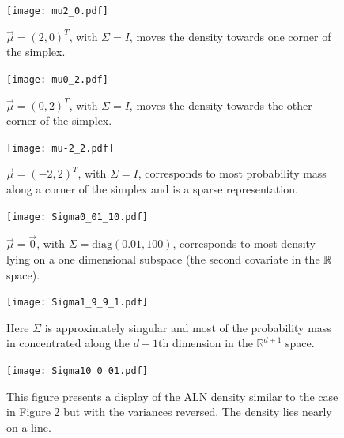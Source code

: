 \begin{figure}[ht]
\begin{minipage}[b]{0.45\linewidth}
\centering
\texttt{[image: mu2\_0.pdf]}
\caption[ALN plot with a mean vector $(2,0)^{T}$]{$\vec{\mu}=(2,0)^T$, with $\Sigma=I$, moves the density towards one corner of the simplex. }
\label{fig:figure1}
\end{minipage}
\hspace{0.5cm}
\begin{minipage}[b]{0.45\linewidth}
\centering
\texttt{[image: mu0\_2.pdf]}
\caption[ALN plot with mean vector $(2,0)^{T}$]{$\vec{\mu}=(0,2)^T$, with $\Sigma=I$, moves the density towards the other corner of the simplex. }
\label{fig:figur2}
\end{minipage}
\end{figure}

\begin{figure}[ht]
\begin{minipage}[b]{0.45\linewidth}
\centering
\texttt{[image: mu-2\_2.pdf]}
\caption[ALN plot with a mean vector of $(-2,2)^{T}$]{$\vec{\mu}=(-2,2)^T$, with $\Sigma=I$, corresponds to most probability mass along a corner of the simplex and is a sparse representation.} 
\label{fig:figure3}
\end{minipage}
\hspace{0.5cm}
\begin{minipage}[b]{0.45\linewidth}
\centering
\texttt{[image: Sigma0\_01\_10.pdf]}
\caption[ALN plot $\Sigma=\text{Diag(0.01,100)}$]{ $\vec{\mu}=\vec{0}$, with
 $\Sigma= \text{diag}(0.01, 100)$, corresponds to most density lying on a one dimensional subspace (the second covariate in the $\mathbb{R}^{\ }$ space).  }
\label{fig:figure4}
\end{minipage}
\end{figure}


\begin{figure}[ht]
\begin{minipage}[b]{0.45\linewidth}
\centering
\texttt{[image: Sigma1\_9\_9\_1.pdf]}
\caption[ALN plot $\Sigma$ numerically singular]{Here $\Sigma$ is approximately singular and most of the probability mass in concentrated along the $d+1$th dimension in the $\mathbb{R}^{d+1}$ space.  }
\label{fig:figure5}
\end{minipage}
\hspace{0.5cm}
\begin{minipage}[b]{0.45\linewidth}
\centering
\texttt{[image: Sigma10\_0\_01.pdf]}
\caption[Similar to the case in Figure \ref{fig:figure4} but with the variances reversed]{This figure presents a display of the ALN density similar to the case in Figure \ref{fig:figure4} but with the variances reversed. The density lies nearly on a line.}
\label{fig:figure6}
\end{minipage}
\end{figure}

